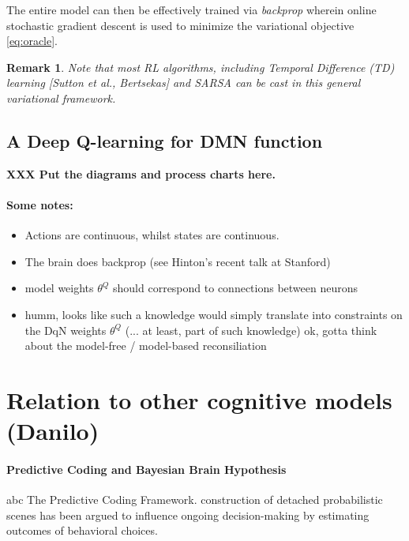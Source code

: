 \documentclass{article} %
\newtheorem{remark}{Remark}
\begin{document}
The entire model can then be effectively trained via \textit{backprop} wherein online stochastic
gradient descent is used to minimize the variational objective \eqref{eq:oracle}.

\begin{remark}
Note that most RL algorithms, including \textit{Temporal Difference (TD)} learning [Sutton et al.,
  Bertsekas] and SARSA can be cast in this general variational framework.
\end{remark}

\subsection{A Deep Q-learning for DMN function}
\textbf{XXX Put the diagrams and process charts here.}

\paragraph*{Some notes:}
\begin{itemize}
  \item Actions are continuous, whilst states are continuous.
  \item The brain does backprop (see Hinton's recent talk at Stanford)
  \item model weights $\theta^Q$ should correspond to connections between neurons
\item humm, looks like such a knowledge would simply translate into constraints on the DqN weights $\theta^Q$ (... at least, part of such knowledge)
  ok, gotta think about the model-free / model-based reconsiliation
\end{itemize}
  

\section{Relation to other cognitive models (Danilo)}
\paragraph{Predictive Coding and Bayesian Brain Hypothesis}
abc
The Predictive Coding Framework.
construction of detached probabilistic scenes has been argued to influence ongoing decision-making by estimating outcomes of behavioral choices.
\end{document}
